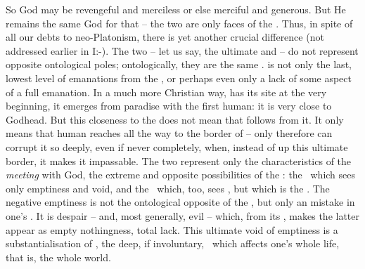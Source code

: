 So God may be revengeful and merciless or else merciful and generous.  But He remains the same God for that -- the
two are only faces of the .  Thus, in spite of all our debts to
neo-Platonism, there is yet another crucial difference (not addressed earlier in
I:-).  The two -- let us say, the
ultimate  and  -- do not represent opposite ontological
poles; ontologically, they are the same .  is not only 
the last, lowest level of emanations from the , or perhaps even only a
lack of some aspect of a full emanation. In a much more Christian way,
 has its site at the very beginning, it emerges from paradise with the
first human: %
it is very {close to} Godhead. But this closeness to the
 does not mean that  follows from it. It only means that
human  reaches all the way to the border of  --
only therefore  can corrupt it so deeply, even if never completely,
when, instead of  up this ultimate border, it makes it impassable.
The two represent only the characteristics of the {\em meeting} with God, the
extreme and opposite possibilities of the : the
\No\ which sees only emptiness and void, and the \Yes\ which, too, sees
, but  which is the .
%
The negative emptiness is not the ontological opposite of the , but only
an  mistake in one's . It is despair -- and, most
generally, evil -- which,  from its , makes
the latter appear as empty nothingness, total lack. This ultimate void of
emptiness is a substantialisation of , the deep, if involuntary, \No\
which affects one's whole life, that is, the whole world.

